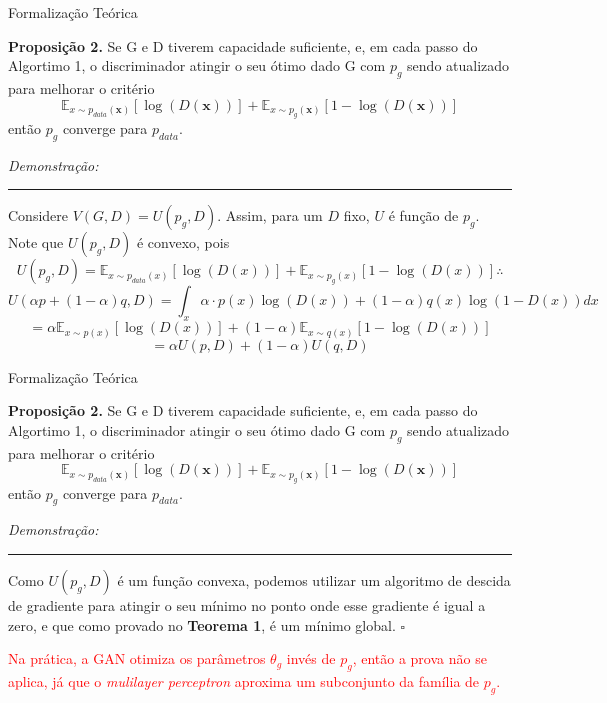 \documentclass[10pt]{beamer}
\newcommand*{\QEDB}{\hfill\ensuremath{\square}}%
\begin{document}
\begin{frame}[fragile]{Formalização Teórica}
	
	\small
	\textbf{Proposição 2.} Se G e D tiverem capacidade suficiente,
	e, em cada passo do Algortimo 1, o discriminador atingir o seu
	ótimo dado G com $p_g$ sendo atualizado para melhorar o critério
    $$
    \mathbb{E}_{x\sim p_{data}(\bm x)}\left[\log{(D(\bm x))}\right]+
    \mathbb{E}_{x\sim p_g(\bm x)}\left[1-\log{(D(\bm x))}\right]
    $$
    então $p_g$ converge para $p_{data}$.

	\textit{Demonstração:}
	\hrule

	Considere $V(G,D) = U(p_g,D)$. Assim, para um $D$ fixo, $U$ é
	função de $p_g$. Note que $U(p_g,D)$ é convexo, pois
	$$ U(p_g,D) = 
    \mathbb{E}_{x\sim p_{data}(x)}\left[\log{(D(x))}\right]+
    \mathbb{E}_{x\sim p_g(x)}\left[1-\log{(D(x))}\right] \therefore
	$$
	\pause
	$$U(\alpha p + (1-\alpha)q,D) = 
	\int_x \alpha\cdot p(x)\log{(D(x))} + (1-\alpha)q(x)\log{(1-D(x))}dx
	$$
	$$
	=
    \alpha\mathbb{E}_{x\sim p(x)}\left[\log{(D(x))}\right]+
    (1-\alpha)\mathbb{E}_{x\sim q(x)}\left[1-\log{(D(x))}\right]
	$$
	$$
	= \alpha U(p,D) + (1-\alpha)U(q,D)
	$$

\end{frame}

\begin{frame}[fragile]{Formalização Teórica}
	
	\small
	\textbf{Proposição 2.} Se G e D tiverem capacidade suficiente,
	e, em cada passo do Algortimo 1, o discriminador atingir o seu
	ótimo dado G com $p_g$ sendo atualizado para melhorar o critério
    $$
    \mathbb{E}_{x\sim p_{data}(\bm x)}\left[\log{(D(\bm x))}\right]+
    \mathbb{E}_{x\sim p_g(\bm x)}\left[1-\log{(D(\bm x))}\right]
    $$
    então $p_g$ converge para $p_{data}$.

	\textit{Demonstração:}
	\hrule

	Como $U(p_g,D)$ é um função convexa, podemos utilizar um algoritmo
	de descida de gradiente para atingir o seu mínimo no ponto
	onde esse gradiente é igual a zero, e que como provado
	no \textbf{Teorema 1}, é um mínimo global.
	\QEDB
	\pause

	\textcolor{red}{Na prática, a GAN otimiza os parâmetros
	$\theta_g$ invés de $p_g$, então a prova não se aplica,
	já que o \textit{mulilayer perceptron} aproxima um subconjunto
	da família de $p_g$.}

\end{frame}

\AtBeginSection{}
\end{document}

